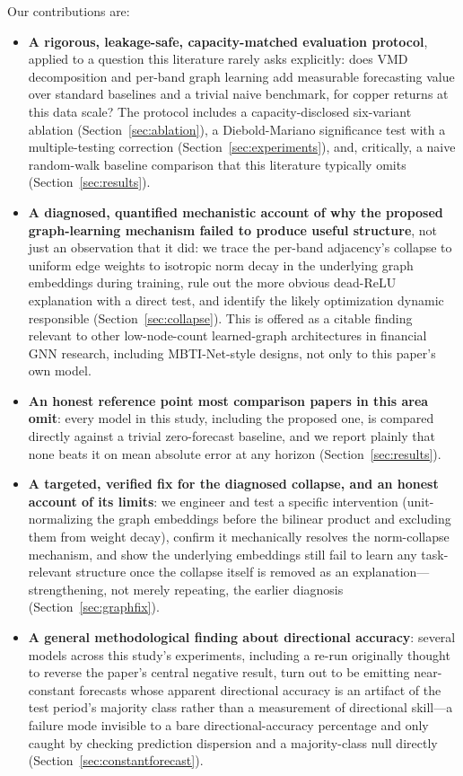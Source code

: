 \documentclass[journal]{IEEEtran}
\begin{document}
Our contributions are:
\begin{itemize}
    \item \textbf{A rigorous, leakage-safe, capacity-matched evaluation protocol}, applied to a question this literature rarely asks explicitly: does VMD decomposition and per-band graph learning add measurable forecasting value over standard baselines and a trivial naive benchmark, for copper returns at this data scale? The protocol includes a capacity-disclosed six-variant ablation (Section~\ref{sec:ablation}), a Diebold-Mariano significance test with a multiple-testing correction (Section~\ref{sec:experiments}), and, critically, a naive random-walk baseline comparison that this literature typically omits (Section~\ref{sec:results}).
    \item \textbf{A diagnosed, quantified mechanistic account of why the proposed graph-learning mechanism failed to produce useful structure}, not just an observation that it did: we trace the per-band adjacency's collapse to uniform edge weights to isotropic norm decay in the underlying graph embeddings during training, rule out the more obvious dead-ReLU explanation with a direct test, and identify the likely optimization dynamic responsible (Section~\ref{sec:collapse}). This is offered as a citable finding relevant to other low-node-count learned-graph architectures in financial GNN research, including MBTI-Net-style designs, not only to this paper's own model.
    \item \textbf{An honest reference point most comparison papers in this area omit}: every model in this study, including the proposed one, is compared directly against a trivial zero-forecast baseline, and we report plainly that none beats it on mean absolute error at any horizon (Section~\ref{sec:results}).
    \item \textbf{A targeted, verified fix for the diagnosed collapse, and an honest account of its limits}: we engineer and test a specific intervention (unit-normalizing the graph embeddings before the bilinear product and excluding them from weight decay), confirm it mechanically resolves the norm-collapse mechanism, and show the underlying embeddings still fail to learn any task-relevant structure once the collapse itself is removed as an explanation---strengthening, not merely repeating, the earlier diagnosis (Section~\ref{sec:graphfix}).
    \item \textbf{A general methodological finding about directional accuracy}: several models across this study's experiments, including a re-run originally thought to reverse the paper's central negative result, turn out to be emitting near-constant forecasts whose apparent directional accuracy is an artifact of the test period's majority class rather than a measurement of directional skill---a failure mode invisible to a bare directional-accuracy percentage and only caught by checking prediction dispersion and a majority-class null directly (Section~\ref{sec:constantforecast}).
\end{itemize}
\end{document}
